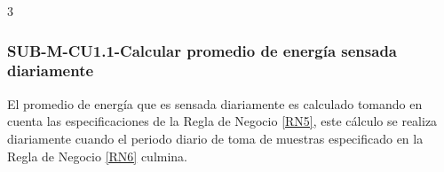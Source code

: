 3\subsubsection{SUB-M-CU1.1-Calcular promedio de energía sensada diariamente}\label{SUB-M-CU1.1}
El promedio de energía que es sensada diariamente es calculado tomando en cuenta las especificaciones de la Regla de Negocio \ref{RN5}, este cálculo se realiza diariamente cuando el periodo diario de toma de muestras especificado en la Regla de Negocio \ref{RN6} culmina.
